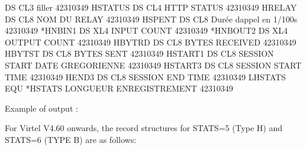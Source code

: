 \documentclass[letterpaper,10pt,english]{sphinxmanual}
\begin{document}
\begin{sphinxVerbatim}[commandchars=\\\{\}]
         DS    CL3                     filler                  42310349
H\PYGZdl{}STATUS DS    CL4                     HTTP STATUS             42310349
H\PYGZdl{}RELAY  DS    CL8                     NOM DU RELAY            42310349
H\PYGZdl{}SPENT  DS    CL8                     Durée d\PYGZsq{}appel en 1/100s 42310349
*H\PYGZdl{}NBIN1  DS    XL4                    INPUT COUNT             42310349
*H\PYGZdl{}NBOUT2 DS    XL4                    OUTPUT COUNT            42310349
H\PYGZdl{}BYTRD  DS    CL8                     BYTES RECEIVED          42310349
H\PYGZdl{}BYTST  DS    CL8                     BYTES SENT              42310349
H\PYGZdl{}START1 DS    CL8              SESSION START DATE GREGORIENNE 42310349
H\PYGZdl{}START3 DS    CL8                     SESSION START TIME      42310349
H\PYGZdl{}END3   DS    CL8                     SESSION END TIME        42310349
LHSTATS  EQU   *\PYGZhy{}HSTATS                LONGUEUR ENREGISTREMENT 42310349
\end{sphinxVerbatim}

\sphinxAtStartPar
Example of output :\sphinxhyphen{}

\sphinxAtStartPar
{}

\sphinxAtStartPar
For Virtel V4.60 onwards, the record structures for STATS=5 (Type H) and STATS=6 (TYPE B) are as follows: \sphinxhyphen{}
\end{document}
